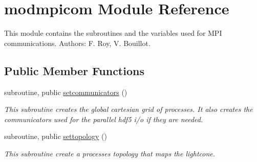 \hypertarget{classmodmpicom}{\section{modmpicom Module Reference}
\label{classmodmpicom}
}


This module contains the subroutines and the variables used for M\-P\-I communications. Authors\-: F. Roy, V. Bouillot.  


\subsection*{Public Member Functions}
\begin{DoxyCompactItemize}
\item 
subroutine, public \hyperlink{classmodmpicom_a7cbb93c720bce9f56e7482758ab348c5}{setcommunicators} ()
\begin{DoxyCompactList}\small\item\em This subroutine creates the global cartesian grid of processes. It also creates the communicators used for the parallel hdf5 i/o if they are needed. \end{DoxyCompactList}\item 
subroutine, public \hyperlink{classmodmpicom_abc2ffa06e3665781143ba0241350b976}{settopology} ()
\begin{DoxyCompactList}\small\item\em This subroutine create a processes topology that maps the lightcone. \end{DoxyCompactList}\end{DoxyCompactItemize}
